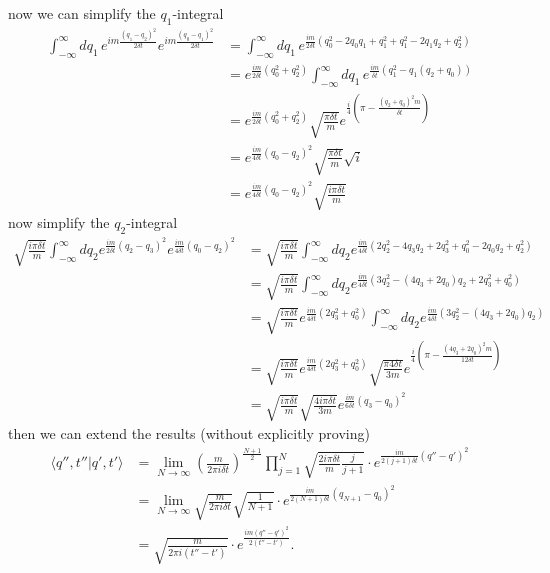 \documentclass[10pt,a4paper]{book}
\theoremstyle{definition}
\begin{document}
now we can simplify the $q_1$-integral
\begin{align}
\int_{-\infty}^{\infty}dq_1\,e^{im\frac{(q_1-q_2)^2}{2\delta t}}e^{im\frac{(q_0-q_1)^2}{2\delta t}}
&=\int_{-\infty}^{\infty}dq_1\,e^{\frac{im}{2\delta t}(q_0^2-2q_0q_1+q_1^2+q_1^2-2q_1q_2+q_2^2)}\\
&=e^{\frac{im}{2\delta t}(q_0^2+q_2^2)}\int_{-\infty}^{\infty}dq_1\,e^{\frac{im}{\delta t}(q^2_1-q_1(q_2+q_0))}\\
&=e^{\frac{im}{2\delta t}(q_0^2+q_2^2)}\sqrt{\frac{\pi\delta t}{m}}e^{\frac{i}{4}\left(\pi-\frac{(q_2+q_0)^2m}{\delta t}\right)}\\
&=e^{\frac{im}{4\delta t}(q_0-q_2)^2}\sqrt{\frac{\pi\delta t}{m}}\sqrt{i}\\
&=e^{\frac{im}{4\delta t}(q_0-q_2)^2}\sqrt{\frac{i\pi\delta t}{m}}
\end{align}
now simplify the $q_2$-integral
\begin{align}
\sqrt{\frac{i\pi\delta t}{m}}\int_{-\infty}^\infty dq_2e^{\frac{im}{2\delta t}(q_2-q_3)^2}e^{\frac{im}{4\delta t}(q_0-q_2)^2}
&=\sqrt{\frac{i\pi\delta t}{m}}\int_{-\infty}^\infty dq_2e^{\frac{im}{4\delta t}(2q_2^2-4q_3q_2+2q_3^2+q_0^2-2q_0q_2+q_2^2)}\\
&=\sqrt{\frac{i\pi\delta t}{m}}\int_{-\infty}^\infty dq_2e^{\frac{im}{4\delta t}(3q_2^2-(4q_3+2q_0)q_2+2q_3^2+q_0^2)}\\
&=\sqrt{\frac{i\pi\delta t}{m}}e^{\frac{im}{4\delta t}(2q_3^2+q_0^2)}\int_{-\infty}^\infty dq_2e^{\frac{im}{4\delta t}(3q_2^2-(4q_3+2q_0)q_2)}\\
&=\sqrt{\frac{i\pi\delta t}{m}}e^{\frac{im}{4\delta t}(2q_3^2+q_0^2)}\sqrt{\frac{\pi4\delta t}{3m}}e^{\frac{i}{4}\left(\pi-\frac{(4q_3+2q_0)^2m}{12\delta t}\right)}\\
&=\sqrt{\frac{i\pi\delta t}{m}}\sqrt{\frac{4i\pi\delta t}{3m}}e^{\frac{im}{6\delta t}(q_3-q_0)^2}
\end{align}
then we can extend the results (without explicitly proving)
\begin{align}
\langle q'',t''|q',t'\rangle
&=\lim_{N\rightarrow\infty}\left(\frac{m}{2\pi i\delta t}\right)^\frac{N+1}{2}\prod_{j=1}^N\sqrt{\frac{2i\pi\delta t}{m}\frac{j}{j+1}}\cdot e^{\frac{im}{2(j+1)\delta t}(q''-q')^2}\\
&=\lim_{N\rightarrow\infty}\sqrt{\frac{m}{2\pi i\delta t}}\sqrt{\frac{1}{N+1}}\cdot e^{\frac{im}{2(N+1)\delta t}(q_{N+1}-q_0)^2}\\
&=\sqrt{\frac{m}{2\pi i(t''-t')}}\cdot e^{\frac{im(q''-q')^2}{2(t''-t')}}.
\end{align}
\end{document}
